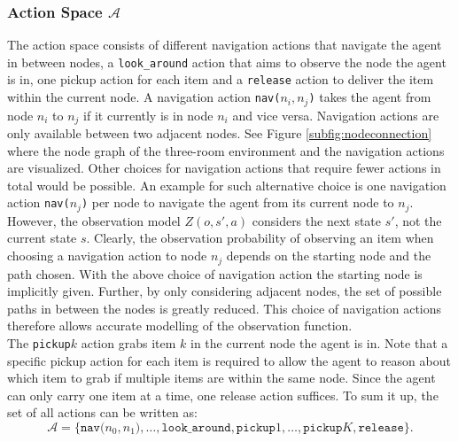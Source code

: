 \subsubsection{Action Space $\mathcal{A}$}
The action space consists of different navigation actions that navigate the agent in between nodes, a \texttt{look\_around} action that aims to observe the node the agent is in, one pickup action for each item and a \texttt{release} action to deliver the item within the current node. A navigation action \texttt{nav($n_i, n_j$)} takes the agent from node $n_i$ to $n_j$ if it currently is in node $n_i$ and vice versa. Navigation actions are only available between two adjacent nodes. See Figure \ref{subfig:nodeconnection} where the node graph of the three-room environment and the navigation actions are visualized. Other choices for navigation actions that require fewer actions in total would be possible. An example for such alternative choice is one navigation action \texttt{nav($n_j$)} per node to navigate the agent from its current node to $n_j$. However, the observation model $Z(o, s', a)$ considers the next state $s'$, not the current state $s$. Clearly, the observation probability of observing an item when choosing a navigation action to node $n_j$ depends on the starting node and the path chosen. With the above choice of navigation action the starting node is implicitly given. Further, by only considering adjacent nodes, the set of possible paths in between the nodes is greatly reduced. This choice of navigation actions therefore allows accurate modelling of the observation function.\\

The \texttt{pickup$k$} action grabs item $k$ in the current node the agent is in. Note that a specific pickup action for each item is required to allow the agent to reason about which item to grab if multiple items are within the same node. Since the agent can only carry one item at a time, one release action suffices. To sum it up, the set of all actions can be written as:
\begin{equation}
    \mathcal{A} = \{\texttt{nav($n_0, n_1$)}, \ldots, \texttt{look\_around}, \texttt{pickup$1$}, \ldots, \texttt{pickup$K$}, \texttt{release}\}.
\end{equation}

